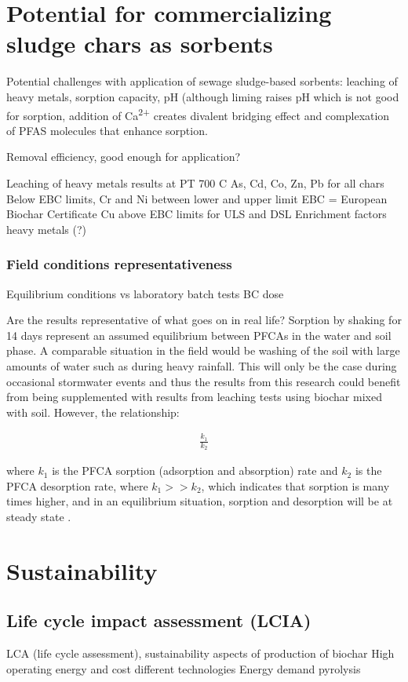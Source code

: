\section{Potential for commercializing sludge chars as sorbents}
Potential challenges with application of sewage sludge-based sorbents: leaching of heavy metals, sorption capacity, pH (although liming raises pH which is not good for sorption, addition of Ca\textsuperscript{2+} creates divalent bridging effect and complexation of PFAS molecules that enhance sorption. 

Removal efficiency, good enough for application?

Leaching of heavy metals results at PT 700 C
    As, Cd, Co, Zn, Pb for all chars Below EBC limits, Cr and Ni between lower and upper limit
    EBC = European Biochar Certificate
    Cu above EBC limits for ULS and DSL
    Enrichment factors heavy metals (?)

\subsubsection{Field conditions representativeness}

Equilibrium conditions vs laboratory batch tests
BC dose

Are the results representative of what goes on in real life? Sorption by shaking for 14 days represent an assumed equilibrium between PFCAs in the water and soil phase. A comparable situation in the field would be washing of the soil with large amounts of water such as during heavy rainfall. This will only be the case during occasional stormwater events and thus the results from this research could benefit from being supplemented with results from leaching tests using biochar mixed with soil. However, the relationship:

\begin{align}
    \frac{k_1}{k_2}
\end{align}

where \(k_1\) is the PFCA sorption (adsorption and absorption) rate and \(k_2\) is the PFCA desorption rate, where \(k_1>>k_2\), which indicates that sorption is many times higher, and in an equilibrium situation, sorption and desorption will be at steady state \citep{Cornelissen2005}. 

\section{Sustainability}
\subsection{Life cycle impact assessment (LCIA)}
LCA (life cycle assessment), sustainability aspects of production of biochar
High operating energy and cost different technologies \citep{Alhashimi2017}
Energy demand pyrolysis 

